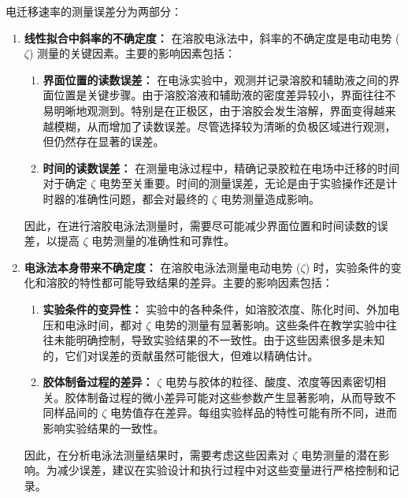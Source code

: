 电迁移速率的测量误差分为两部分：
\begin{enumerate}
    \item \textbf{线性拟合中斜率的不确定度：}
    在溶胶电泳法中，斜率的不确定度是电动电势 (\( \zeta \)) 测量的关键因素。主要的影响因素包括：

    \begin{enumerate}
        \item \textbf{界面位置的读数误差：} 在电泳实验中，观测并记录溶胶和辅助液之间的界面位置是关键步骤。由于溶胶溶液和辅助液的密度差异较小，界面往往不易明晰地观测到。特别是在正极区，由于溶胶会发生溶解，界面变得越来越模糊，从而增加了读数误差。尽管选择较为清晰的负极区域进行观测，但仍然存在显著的误差。
    
        \item \textbf{时间的读数误差：} 在测量电泳过程中，精确记录胶粒在电场中迁移的时间对于确定 \(\zeta\) 电势至关重要。时间的测量误差，无论是由于实验操作还是计时器的准确性问题，都会对最终的 \(\zeta\) 电势测量造成影响。
    \end{enumerate}
    
    因此，在进行溶胶电泳法测量时，需要尽可能减少界面位置和时间读数的误差，以提高 \(\zeta\) 电势测量的准确性和可靠性。
    
    \item \textbf{电泳法本身带来不确定度：}
    在溶胶电泳法测量电动电势 (\( \zeta \)) 时，实验条件的变化和溶胶的特性都可能导致结果的差异。主要的影响因素包括\cite{dong2013zeta}：

    \begin{enumerate}
        \item \textbf{实验条件的变异性：} 实验中的各种条件，如溶胶浓度、陈化时间、外加电压和电泳时间，都对 \( \zeta \) 电势的测量有显著影响。这些条件在教学实验中往往未能明确控制，导致实验结果的不一致性。由于这些因素很多是未知的，它们对误差的贡献虽然可能很大，但难以精确估计。
    
        \item \textbf{胶体制备过程的差异：} \( \zeta \) 电势与胶体的粒径、酸度、浓度等因素密切相关。胶体制备过程的微小差异可能对这些参数产生显著影响，从而导致不同样品间的 \( \zeta \) 电势值存在差异。每组实验样品的特性可能有所不同，进而影响实验结果的一致性。
    \end{enumerate}
    
    因此，在分析电泳法测量结果时，需要考虑这些因素对 \( \zeta \) 电势测量的潜在影响。为减少误差，建议在实验设计和执行过程中对这些变量进行严格控制和记录。
\end{enumerate}

